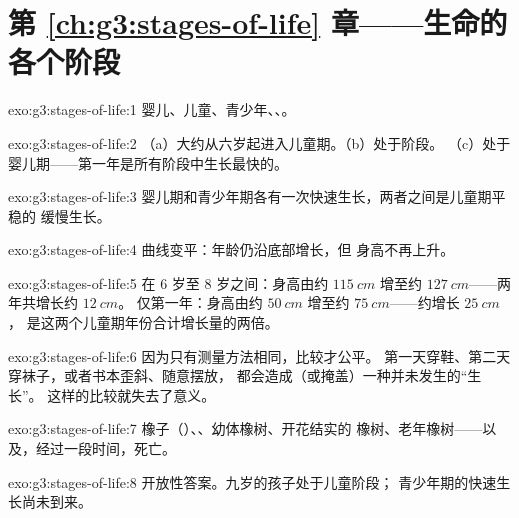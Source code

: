 \section*{第 \ref{ch:g3:stages-of-life} 章——生命的各个阶段}

\begin{solution}{exo:g3:stages-of-life:1}
婴儿、儿童、青少年、、。
\end{solution}

\begin{solution}{exo:g3:stages-of-life:2}
（a）大约从六岁起进入儿童期。（b）处于阶段。
（c）处于婴儿期——第一年是所有阶段中生长最快的。
\end{solution}

\begin{solution}{exo:g3:stages-of-life:3}
婴儿期和青少年期各有一次快速生长，两者之间是儿童期平稳的
缓慢生长。
\end{solution}

\begin{solution}{exo:g3:stages-of-life:4}
曲线变平：年龄仍沿底部增长，但
身高不再上升。
\end{solution}

\begin{solution}{exo:g3:stages-of-life:5}
在 $6$ 岁至 $8$ 岁之间：身高由约 $\qty{115}{cm}$ 增至约
$\qty{127}{cm}$——两年共增长约 $\qty{12}{cm}$。
仅第一年：身高由约 $\qty{50}{cm}$ 增至约
$\qty{75}{cm}$——约增长 $\qty{25}{cm}$，
是这两个儿童期年份合计增长量的两倍。
\end{solution}

\begin{solution}{exo:g3:stages-of-life:6}
因为只有测量方法相同，比较才公平。
第一天穿鞋、第二天穿袜子，或者书本歪斜、随意摆放，
都会造成（或掩盖）一种并未发生的“生长”。
这样的比较就失去了意义。
\end{solution}

\begin{solution}{exo:g3:stages-of-life:7}
橡子（）、、幼体橡树、开花结实的
橡树、老年橡树——以及，经过一段时间，死亡。
\end{solution}

\begin{solution}{exo:g3:stages-of-life:8}
开放性答案。九岁的孩子处于儿童阶段；
青少年期的快速生长尚未到来。
\end{solution}


